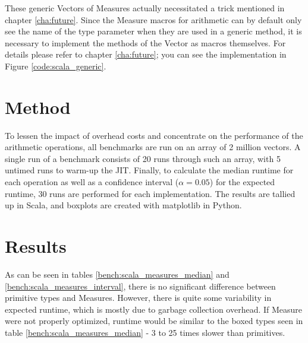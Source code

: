 \documentclass[12pt,oneside,a4paper]{scrbook}
\begin{document}
These generic Vectors of Measures actually necessitated a trick mentioned in chapter \ref{cha:future}. Since the Measure macros for arithmetic can by default only see the name of the type parameter when they are used in a generic method, it is necessary to implement the methods of the Vector as macros themselves. For details please refer to chapter \ref{cha:future}; you can see the implementation in Figure \ref{code:scala_generic}.

\section{Method}
To lessen the impact of overhead costs and concentrate on the performance of the arithmetic operations, all benchmarks are run on an array of 2 million vectors. A single run of a benchmark consists of 20 runs through such an array, with 5 untimed runs to warm-up the JIT. Finally, to calculate the median runtime for each operation as well as a confidence interval ($\alpha = 0.05$) for the expected runtime, 30 runs are performed for each implementation. The results are tallied up in Scala, and boxplots are created with matplotlib in Python.

\section{Results}
As can be seen in tables \ref{bench:scala_measures_median} and \ref{bench:scala_measures_interval}, there is no significant difference between primitive types and Measures. However, there is quite some variability in expected runtime, which is mostly due to garbage collection overhead. If Measure were not properly optimized, runtime would be similar to the boxed types seen in table \ref{bench:scala_measures_median} - 3 to 25 times slower than primitives.
\end{document}
